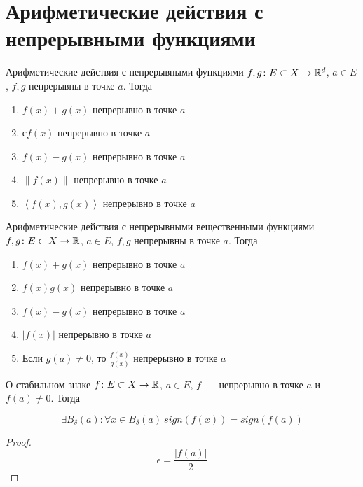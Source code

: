 ﻿\section{Арифметические действия с непрерывными функциями}

\begin{theorem}{Арифметические действия с непрерывными функциями}
$f, g\colon E \subset X \to \mathbb{R}^d$, $a \in E$, $f, g$ непрерывны в точке $a$. Тогда

\begin{enumerate}
\item $f(x)+g(x)$ непрерывно в точке $a$
\item $сf(x)$ непрерывно в точке $a$
\item $f(x) - g(x)$ непрерывно в точке $a$
\item $\| f(x) \|$ непрерывно в точке $a$
\item $\left<f(x), g(x)\right>$ непрерывно в точке $a$
\end{enumerate}
\end{theorem}

\begin{theorem}{Арифметические действия с непрерывными вещественными функциями}
$f, g\colon E \subset X \to \mathbb{R}$, $a \in E$, $f, g$ непрерывны в точке $a$. Тогда
\begin{enumerate}
\item $f(x) + g(x)$ непрерывно в точке $a$
\item $f(x)g(x)$ непрерывно в точке $a$
\item $f(x) - g(x)$ непрерывно в точке $a$
\item $|f(x)|$ непрерывно в точке $a$
\item Если $g(a) \ne 0$, то $\frac{f(x)}{g(x)}$ непрерывно в точке $a$
\end{enumerate}
\end{theorem}

\begin{theorem}{О стабильном знаке}
$f\colon E \subset X \to \mathbb{R}$, $a \in E$, $f$~--- непрерывно в точке $a$ и $f(a) \ne 0$. Тогда

$$\exists B_{\delta}(a)\colon \forall x \in B_{\delta}(a)\: sign(f(x)) = sign(f(a))$$
\end{theorem}
 
\begin{proof}
$$\epsilon = \frac{|f(a)|}{2}$$
\end{proof}


